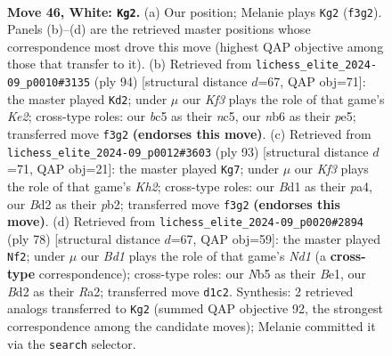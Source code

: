 \documentclass[11pt]{article}
\begin{document}
\clearpage

\begin{figure}[p]\centering
\begin{subfigure}{0.46\textwidth}\centering
\resizebox{\linewidth}{!}{%
\newchessgame
\chessboard[
  setfen={1nb5/1p6/1n4k1/pNbp2p1/7p/PP2PK1P/3BP3/3B4 w - - 4 46},
  showmover=false,
  pgfstyle=straightmove, color=movearrow, markmove={f3-g2}
]}
\caption{}
\end{subfigure}\hfill
\begin{subfigure}{0.46\textwidth}\centering
\resizebox{\linewidth}{!}{%
\newchessgame
\chessboard[
  setfen={8/2pb2k1/5p2/2n1pP2/p1PpP2N/P2P4/2B1K3/8 w - - 3 48},
  showmover=false,
  pgfstyle=straightmove, color=movearrow, markmove={e2-d2}
]}
\caption{}
\end{subfigure}
\\[4pt]
\begin{subfigure}{0.46\textwidth}\centering
\resizebox{\linewidth}{!}{%
\newchessgame
\chessboard[
  setfen={8/7k/3n1p1p/p2P3P/P1p2P2/1pN5/1Pb1B1P1/6K1 b - - 0 47},
  showmover=false,
  pgfstyle=straightmove, color=movearrow, markmove={h7-g7}
]}
\caption{}
\end{subfigure}\hfill
\begin{subfigure}{0.46\textwidth}\centering
\resizebox{\linewidth}{!}{%
\newchessgame
\chessboard[
  setfen={8/1k2b1p1/2n1p3/pp1pP3/3Pb3/2P3P1/R7/3NB1K1 w - - 0 40},
  showmover=false,
  pgfstyle=straightmove, color=movearrow, markmove={d1-f2}
]}
\caption{}
\end{subfigure}
\caption{\textbf{Move 46, White: \texttt{Kg2}.} (a) Our position; Melanie plays \texttt{Kg2} (\texttt{f3g2}). Panels (b)--(d) are the retrieved master positions whose correspondence most drove this move (highest QAP objective among those that transfer to it). (b) Retrieved from \texttt{lichess\_elite\_2024-09\_p0010\#3135} (ply 94) [structural distance $d$=67, QAP obj=71]: the master played \texttt{Kd2}; under $\mu$ our \emph{Kf3} plays the role of that game's \emph{Ke2}; cross-type roles: our \emph{b}c5 as their \emph{n}c5, our \emph{n}b6 as their \emph{p}e5; transferred move \texttt{f3g2} \textbf{(endorses this move)}. (c) Retrieved from \texttt{lichess\_elite\_2024-09\_p0012\#3603} (ply 93) [structural distance $d$=71, QAP obj=21]: the master played \texttt{Kg7}; under $\mu$ our \emph{Kf3} plays the role of that game's \emph{Kh2}; cross-type roles: our \emph{B}d1 as their \emph{p}a4, our \emph{B}d2 as their \emph{p}b2; transferred move \texttt{f3g2} \textbf{(endorses this move)}. (d) Retrieved from \texttt{lichess\_elite\_2024-09\_p0020\#2894} (ply 78) [structural distance $d$=67, QAP obj=59]: the master played \texttt{Nf2}; under $\mu$ our \emph{Bd1} plays the role of that game's \emph{Nd1} (a \textbf{cross-type} correspondence); cross-type roles: our \emph{N}b5 as their \emph{B}e1, our \emph{B}d2 as their \emph{R}a2; transferred move \texttt{d1c2}. Synthesis: 2 retrieved analogs transferred to \texttt{Kg2} (summed QAP objective 92, the strongest correspondence among the candidate moves); Melanie committed it via the \texttt{search} selector.}
\label{fig:thought-m90}
\end{figure}
\end{document}
